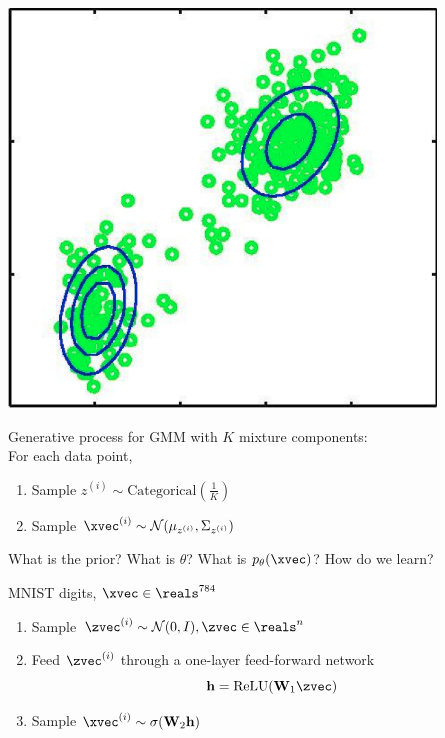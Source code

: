 \begin{frame}
  \begin{center}
   \end{center}
   \center
\includegraphics[scale=0.5]{gmm2}
\end{frame}

\begin{frame}
  \begin{center}
   \end{center}   
 Generative process for GMM with $K$ mixture components: \\
 For each data point, 
 \begin{enumerate}
 \item Sample $z^{(i)} \sim \text{Categorical}(\frac{1}{K})$ 
 \item Sample $\xvec^{(i)} \sim \mathcal{N}(\mu_{z^{(i)}}, \Sigma_{z^{(i)}})$
 \end{enumerate}
 
 What is the prior? What is $\theta$? What is $p_\theta(\xvec)$? How do we learn?
\end{frame}

\begin{frame}
  \begin{center}
   \end{center}   
MNIST digits, $\xvec \in \reals^{784}$
 \begin{enumerate}
 \item Sample $\zvec^{(i)} \sim \mathcal{N}(0, I), \zvec \in \reals^n$ 
 \item Feed $\zvec^{(i)}$ through a one-layer feed-forward network
 \[ \mathbf{h} = \text{ReLU}(\mathbf{W}_1 \zvec)\]
 \item Sample $\xvec^{(i)} \sim \sigma(\mathbf{W}_2 \mathbf{h})$
 \end{enumerate}
\end{frame}

